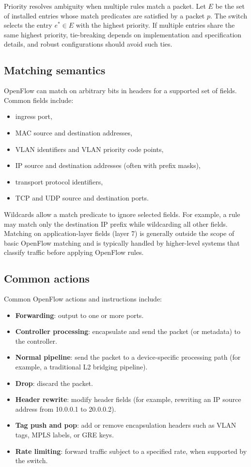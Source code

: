 \documentclass[11pt,a4paper,openany]{report}
\begin{document}
Priority resolves ambiguity when multiple rules match a packet. Let $E$ be the set of installed entries whose match predicates are satisfied by a packet $p$. The switch selects the entry $e^* \in E$ with the highest priority. If multiple entries share the same highest priority, tie-breaking depends on implementation and specification details, and robust configurations should avoid such ties.

\subsection{Matching semantics}

OpenFlow can match on arbitrary bits in headers for a supported set of fields. Common fields include:

\begin{itemize}
\item ingress port,
\item MAC source and destination addresses,
\item VLAN identifiers and VLAN priority code points,
\item IP source and destination addresses (often with prefix masks),
\item transport protocol identifiers,
\item TCP and UDP source and destination ports.
\end{itemize}

Wildcards allow a match predicate to ignore selected fields. For example, a rule may match only the destination IP prefix while wildcarding all other fields. Matching on application-layer fields (layer 7) is generally outside the scope of basic OpenFlow matching and is typically handled by higher-level systems that classify traffic before applying OpenFlow rules.

\subsection{Common actions}

Common OpenFlow actions and instructions include:

\begin{itemize}
\item \textbf{Forwarding}: output to one or more ports.
\item \textbf{Controller processing}: encapsulate and send the packet (or metadata) to the controller.
\item \textbf{Normal pipeline}: send the packet to a device-specific processing path (for example, a traditional L2 bridging pipeline).
\item \textbf{Drop}: discard the packet.
\item \textbf{Header rewrite}: modify header fields (for example, rewriting an IP source address from 10.0.0.1 to 20.0.0.2).
\item \textbf{Tag push and pop}: add or remove encapsulation headers such as VLAN tags, MPLS labels, or GRE keys.
\item \textbf{Rate limiting}: forward traffic subject to a specified rate, when supported by the switch.
\end{itemize}
\end{document}
